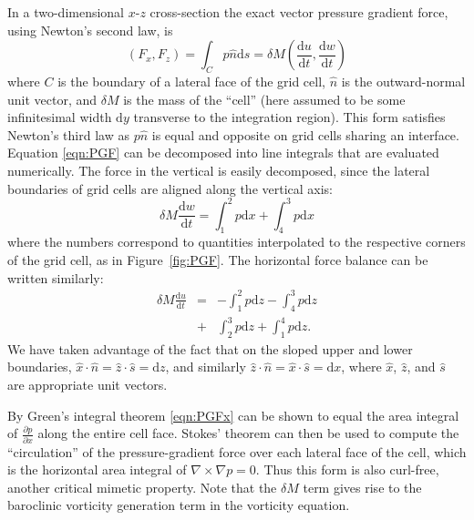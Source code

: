 \documentclass[10pt,letterpaper,margin=1in]{memoir}
\begin{document}
In a two-dimensional $x$-$z$ cross-section the exact vector pressure gradient force, using Newton's second law, is 
\begin{equation}\label{eqn:PGF}
\left ( F_x, F_z \right ) = \int_C p \hat{n} \mathrm{d}s = \delta M \left ( \frac{\mathrm{d}u}{\mathrm{d}t} , \frac{\mathrm{d}w}{\mathrm{d}t}  \right )
\end{equation}
where $C$ is the boundary of a lateral face of the grid cell, $\hat{n}$ is the outward-normal unit vector, and $\delta M$ is the mass of the ``cell'' (here assumed to be some infinitesimal width $\mathrm{d}y$ transverse to the integration region). This form satisfies Newton's third law as $p \hat{n}$ is equal and opposite on grid cells sharing an interface. 
Equation \eqref{eqn:PGF} can be decomposed into line integrals that are evaluated numerically.
The force in the vertical is easily decomposed, since the lateral boundaries of grid cells are aligned along the vertical axis:
\begin{equation} \label{eqn:PGFz}
\delta M \frac{\mathrm{d}w}{\mathrm{d}{t}} =  \int_1^2 p \mathrm{d}x + \int_4^3 p \mathrm{d}x 
\end{equation}
where the numbers correspond to quantities interpolated to the respective corners of the grid cell, as in Figure~\ref{fig:PGF}.
The horizontal force balance can be written similarly:
\begin{eqnarray}\label{eqn:PGFx}
\delta M \frac{\mathrm{d}u}{\mathrm{d}{t}} & = & - \int_1^2 p \mathrm{d}z - \int_4^3 p \mathrm{d}z  \\
     &+ & \int_2^3 p  \mathrm{d}z + \int_1^4 p  \mathrm{d}z.
\end{eqnarray}
We have taken advantage of the fact that on the sloped upper and lower boundaries, $\hat{x}\cdot\hat{n} = \hat{z}\cdot\hat{s} = \mathrm{d}z$, and similarly $\hat{z}\cdot\hat{n} = \hat{x}\cdot\hat{s} = \mathrm{d}x$, where $\hat{x}$, $\hat{z}$, and $\hat{s}$ are appropriate unit vectors.


By Green's integral theorem \eqref{eqn:PGFx} can be shown to equal the area integral of $\frac{\partial p}{\partial x}$ along the entire cell face. Stokes' theorem can then be used to compute the ``circulation'' of the pressure-gradient force over each lateral face of the cell, which is the horizontal area integral of $\nabla \times \nabla p = 0$. Thus this form is also curl-free, another critical mimetic property. Note that the $\delta M$ term gives rise to the baroclinic vorticity generation term in the vorticity equation.
\end{document}
